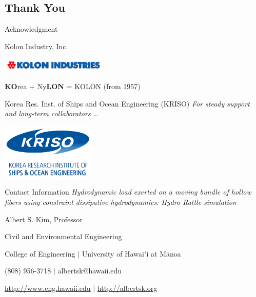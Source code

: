 \documentclass[t,presentation]{beamer}
\begin{document}
\subsection{Thank You}
\label{sec:org4abef29}
\begin{frame}[label={sec:org8a05f38}]{Acknowledgment}
\begin{block}{Kolon Industry, Inc.}
\begin{center}
\includegraphics[width=2.0in]{figures/kolon-logo.jpg}
\label{org3dbc5a4}
\end{center}
\vspace{-0.25cm}
\large
\centering
\textbf{KO}rea + Ny\textbf{LON} = KOLON (from 1957)
\normalsize
\end{block}

\begin{block}{Korea Res. Inst. of Ships and Ocean Engineering (KRISO)}
\emph{For steady support and long-term collaborators \ldots{}}
\begin{center}
\includegraphics[width=1.75in]{figures/KRISO.png}
\label{org8f512b1}
\end{center}
\end{block}
\end{frame}


\begin{frame}[label={sec:org80737df}]{Contact Information}
\centering
\vspace{.3cm}
\textit{Hydrodynamic load exerted on a moving bundle of hollow fibers  using constraint dissipative hydrodynamics: Hydro-Rattle simulation}

\par \vspace{.3cm}
Albert S. Kim, Professor
\par \vspace{.3cm}
\normalsize
Civil and Environmental Engineering\par
College of Engineering \(|\) University of Hawaiʻi at Mānoa
\par
(808) 956-3718 \(|\) albertsk@hawaii.edu
\par
\vspace{.3cm}
\url{http://www.eng.hawaii.edu} \(|\) \url{http://albertsk.org}
\par
\vspace{.3cm}
\end{frame}
\end{document}
